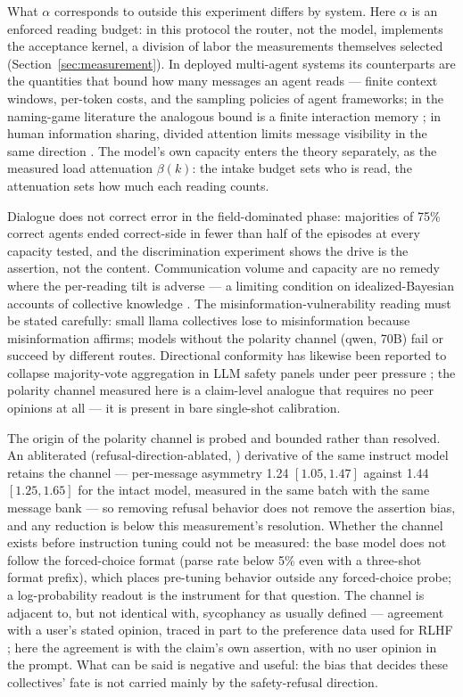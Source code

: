 \documentclass[9pt,twocolumn]{extarticle}
\begin{document}
What $\alpha$ corresponds to outside this experiment differs by system. Here $\alpha$ is an enforced
reading budget: in this protocol the router, not the model, implements the
acceptance kernel, a division of labor the measurements themselves selected
(Section~\ref{sec:measurement}). In deployed multi-agent systems its
counterparts are the quantities that bound how many messages an agent
reads --- finite context windows, per-token costs, and the sampling policies
of agent frameworks; in the naming-game literature the analogous bound is a
finite interaction memory \citep{Flint2026}; in human information sharing,
divided attention limits message visibility in the same direction
\citep{HodasLerman2012}. The model's own capacity enters the theory
separately, as the measured load attenuation $\beta(k)$: the intake budget
sets who is read, the attenuation sets how much each reading counts.

Dialogue does not correct error in the field-dominated phase: majorities of
75\% correct agents ended correct-side in fewer than half of the episodes at
every capacity tested, and the discrimination experiment shows the drive is the assertion,
not the content. Communication volume and capacity are no remedy where the
per-reading tilt is adverse --- a limiting condition on idealized-Bayesian
accounts of collective knowledge \citep{Taniguchi2024}. The
misinformation-vulnerability reading must be stated carefully: small llama
collectives lose to misinformation because misinformation affirms; models
without the polarity channel (qwen, 70B) fail or succeed by different
routes. Directional conformity has likewise been reported to collapse
majority-vote aggregation in LLM safety panels under peer pressure
\citep{HuQu2026}; the polarity channel measured here is a claim-level
analogue that requires no peer opinions at all --- it is present in bare
single-shot calibration.

The origin of the polarity channel is probed and bounded rather than
resolved. An abliterated (refusal-direction-ablated, \citealp{Arditi2024})
derivative of the same instruct model retains the channel --- per-message
asymmetry 1.24 $[1.05, 1.47]$ against 1.44 $[1.25, 1.65]$ for the intact
model, measured in the same batch with the same message bank --- so removing
refusal behavior does not remove the assertion bias, and any reduction is
below this measurement's resolution. Whether the channel exists before
instruction tuning could not be measured: the base model does not follow the
forced-choice format (parse rate below 5\% even with a three-shot format
prefix), which places pre-tuning behavior outside any forced-choice probe; a
log-probability readout is the instrument for that question. The channel is
adjacent to, but not identical with, sycophancy as usually defined ---
agreement with a user's stated opinion, traced in part to the preference
data used for RLHF \citep{Sharma2023}; here the agreement is with the
claim's own assertion, with no user opinion in the prompt. What can be said
is negative and useful: the bias that decides these collectives' fate is not
carried mainly by the safety-refusal direction.
\end{document}
